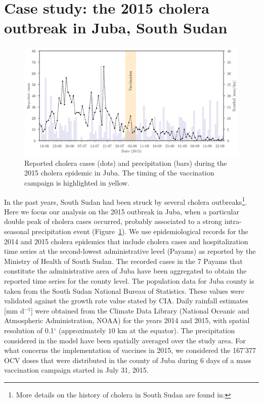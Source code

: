 \section{Case study: the 2015 cholera outbreak in Juba, South Sudan}\label{sec:data sets}
\begin{figure}\centering
  \includegraphics{fig_cholera-rainfall/Lemaitre_ACTROP_2018_42_R1_fig2.png}
  \caption[Cholera cases and precipitation during the 2015 epidemic in Juba]{Reported cholera cases (dots) and precipitation (bars) during the 2015 cholera epidemic in Juba. The timing of the vaccination campaign is highlighted in yellow.}
  \label{fig:report}
\end{figure}
In the past years, South Sudan had been struck by several cholera outbreaks\footnote{More details on the history of cholera in South Sudan are found in: }. Here we focus our analysis on the 2015 outbreak in Juba, when a particular double peak of cholera cases occurred, probably associated to a strong intra-seasonal precipitation event (Figure~\ref{fig:report}). We use epidemiological records for the 2014 and 2015 cholera epidemics that include cholera cases and hospitalization time series at the second-lowest administrative level  (Payams) as reported by the Ministry of Health of South Sudan. The recorded cases in the 7 Payams that constitute the administrative area of Juba have been aggregated to obtain the reported time series for the county level. The population data for Juba county is taken from the South Sudan National Bureau of Statistics\cite{SSNBS:PopulationProjectionsSouth:2015}.
These values were validated against the growth rate value stated by CIA\cite{CIA:SouthSudan:2015}. Daily rainfall estimates [mm d$^{-1}$] were obtained from the Climate Data Library (National Oceanic and Atmospheric Administration, NOAA)\cite{IRI/LDEO:ClimateDataLibrary:2016} for the years 2014 and 2015, with spatial resolution of {0.1}$^\circ$ (approximately $10$ km at the equator). The precipitation considered in the model have been spatially averaged over the study area. For what concerns the implementation of vaccines in 2015, we considered the 167'377 OCV doses that were distributed in the county of Juba during 6 days of a mass vaccination campaign started in July 31, 2015\cite{Abubakar:FirstUseGlobal:2015,Azman:EffectivenessOneDose:2016,Parker:AdaptingGlobalShortage:2017}.

